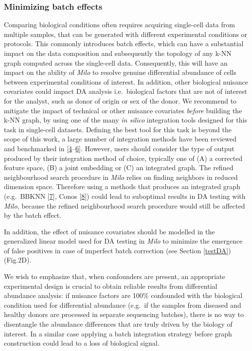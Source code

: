\documentclass[
]{article}
\begin{document}
\hypertarget{minimizing-batch-effects}{%
\subsubsection{Minimizing batch effects}\label{minimizing-batch-effects}}

Comparing biological conditions often requires acquiring single-cell data from multiple samples, that can be generated with different experimental conditions or protocols. This commonly introduces batch effects, which can have a substantial impact on the data composition and subsequently the topology of any k-NN graph computed across the single-cell data. Consequently, this will have an impact on the ability of \emph{Milo} to resolve genuine differential abundance of cells between experimental conditions of interest. In addition, other biological nuisance covariates could impact DA analysis i.e.~biological factors that are not of interest for the analyst, such as donor of origin or sex of the donor. We recommend to mitigate the impact of technical or other nuisance covariates \emph{before} building the k-NN graph, by using one of the many \emph{in silico} integration tools designed for this task in single-cell datasets.
Defining the best tool for this task is beyond the scope of this work, a large number of integration methods have been reviewed and benchmarked in {[}\protect\hyperlink{ref-lueckenBenchmarkingAtlaslevelData2020}{4}--\protect\hyperlink{ref-tranBenchmarkBatcheffectCorrection2020}{6}{]}. However, users should consider the type of output produced by their integration method of choice, typically one of (A) a corrected feature space, (B) a joint embedding or (C) an integrated graph. The refined neighbourhood search procedure in \emph{Milo} relies on finding neighbors in reduced dimension space. Therefore using a methods that produces an integrated graph (e.g.~BBKNN {[}\protect\hyperlink{ref-polanskiBBKNNFastBatch}{7}{]}, Conos {[}\protect\hyperlink{ref-barkasJointAnalysisHeterogeneous2019}{8}{]}) could lead to suboptimal results in DA testing with \emph{Milo}, because the refined neighbourhood search procedure would still be affected by the batch effect.

In addition, the effect of nuisance covariates should be modelled in the generalized linear model used for DA testing in \emph{Milo} to minimize the emergence of false positives in case of imperfect batch correction (see Section \ref{testDA}) (Fig.2D).

We wish to emphasize that, when confounders are present, an appropriate experimental design is crucial to obtain reliable results from differential abundance analysis: if nuisance factors are 100\% confounded with the biological condition used for differential abundance (e.g.~if the samples from diseased and healthy donors are processed in separate sequencing batches), there is no way to disentangle the abundance differences that are truly driven by the biology of interest. In a similar case applying a batch integration strategy before graph construction could lead to a loss of biological signal.
\end{document}
